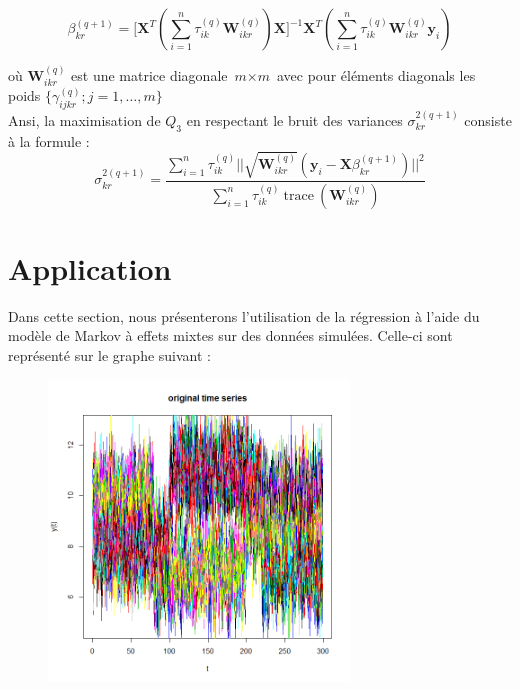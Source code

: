 \documentclass[11pt]{article}
\newcommand{\bsX}{\boldsymbol{X}}
\newcommand{\bsy}{\boldsymbol{y}}
\newcommand{\bsW}{\boldsymbol{W}}
\newcommand{\ciQ}{\textit{Q}}
\newcommand{\cim}{\textit{m}}
\newcommand{\sumn}{\sum_{i=1}^{n}}
\begin{document}
\begin{equation}
\beta_{kr}^{(q+1)} = \Big[ \bsX^{T}(\sumn \tau_{ik}^{(q)} \bsW_{ikr}^{(q)}) \bsX \Big]^{-1}  \bsX^{T}(\sumn \tau_{ik}^{(q)} \bsW_{ikr}^{(q)} \bsy_{i})
\end{equation}

où $\bsW_{ikr}^{(q)}$ est une matrice diagonale $\cim \times \cim$ avec pour éléments diagonals les poids $\{ \gamma_{ijkr}^{(q)}; j= 1,\ldots,\cim \}$ \\

Ansi, la maximisation de $\ciQ_{3}$ en respectant le bruit des variances $\sigma_{kr}^{2(q+1)}$ consiste à la formule : \\

\begin{equation}
\sigma_{kr}^{2(q+1)}= \frac{\sumn \tau_{ik}^{(q)} || \sqrt{\bsW_{ikr}^{(q)}} (\bsy_{i} - \bsX \beta_{kr}^{(q+1)})||^{2}}{\sumn \tau_{ik}^{(q)} \ \text{trace} \ ( \bsW_{ikr}^{(q)})}
\end{equation}


\newpage
\section{Application}

Dans cette section, nous présenterons l'utilisation de la régression à l'aide du modèle de Markov à effets mixtes sur des données simulées. Celle-ci sont représenté sur le graphe suivant : \\

\begin{figure}[h]
\begin{center}
\includegraphics[height=8cm]{data1.png}
\end{center}
\end{figure}
\end{document}
